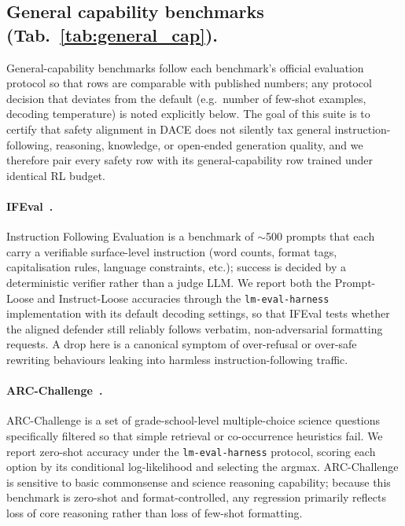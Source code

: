 \documentclass{article}
\newcommand{\method}{\textsc{DACE}\xspace}
\begin{document}
\subsection{General capability benchmarks (Tab.~\ref{tab:general_cap}).}
\label{apdx:bench-cap}

General-capability benchmarks follow each benchmark's official evaluation protocol so that rows are comparable with published numbers; any protocol decision that deviates from the default (e.g.\ number of few-shot examples, decoding temperature) is noted explicitly below. The goal of this suite is to certify that safety alignment in \method does not silently tax general instruction-following, reasoning, knowledge, or open-ended generation quality, and we therefore pair every safety row with its general-capability row trained under identical RL budget.

\paragraph{IFEval~\citep{zhou2023ifeval}.} Instruction Following Evaluation is a benchmark of $\sim$500 prompts that each carry a verifiable surface-level instruction (word counts, format tags, capitalisation rules, language constraints, etc.); success is decided by a deterministic verifier rather than a judge LLM. We report both the Prompt-Loose and Instruct-Loose accuracies through the \texttt{lm-eval-harness} implementation with its default decoding settings, so that IFEval tests whether the aligned defender still reliably follows verbatim, non-adversarial formatting requests. A drop here is a canonical symptom of over-refusal or over-safe rewriting behaviours leaking into harmless instruction-following traffic.

\paragraph{ARC-Challenge~\citep{clark2018arc}.} ARC-Challenge is a set of grade-school-level multiple-choice science questions specifically filtered so that simple retrieval or co-occurrence heuristics fail. We report zero-shot accuracy under the \texttt{lm-eval-harness} protocol, scoring each option by its conditional log-likelihood and selecting the argmax. ARC-Challenge is sensitive to basic commonsense and science reasoning capability; because this benchmark is zero-shot and format-controlled, any regression primarily reflects loss of core reasoning rather than loss of few-shot formatting.
\end{document}
